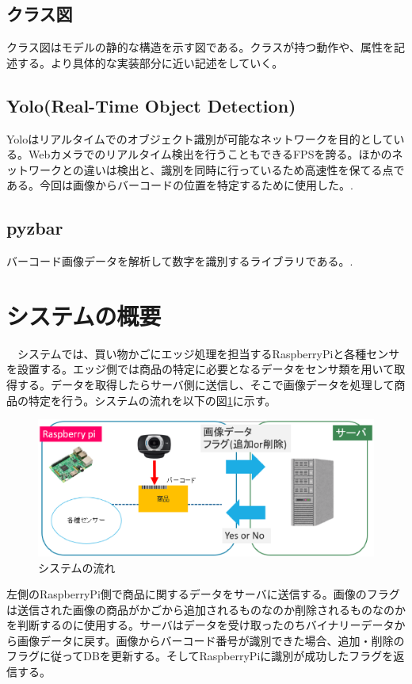 \subsection*{クラス図}
クラス図はモデルの静的な構造を示す図である。クラスが持つ動作や、属性を記述する。より具体的な実装部分に近い記述をしていく。

\subsection*{Yolo(Real-Time Object Detection)}
Yoloはリアルタイムでのオブジェクト識別が可能なネットワークを目的としている。Webカメラでのリアルタイム検出を行うこともできるFPSを誇る。ほかのネットワークとの違いは検出と、識別を同時に行っているため高速性を保てる点である。今回は画像からバーコードの位置を特定するために使用した。\cite{yolo}.


\subsection*{pyzbar}
バーコード画像データを解析して数字を識別するライブラリである。\cite{pyzbar}.

\section{システムの概要}
　システムでは、買い物かごにエッジ処理を担当するRaspberryPiと各種センサを設置する。エッジ側では商品の特定に必要となるデータをセンサ類を用いて取得する。データを取得したらサーバ側に送信し、そこで画像データを処理して商品の特定を行う。システムの流れを以下の図\ref{system_summary}に示す。


\begin{figure}[htbp]
\centering
\includegraphics[width=12cm]{./pic/summary.eps}
\caption{システムの流れ}
\label{system_summary}
\end{figure}

左側のRaspberryPi側で商品に関するデータをサーバに送信する。画像のフラグは送信された画像の商品がかごから追加されるものなのか削除されるものなのかを判断するのに使用する。サーバはデータを受け取ったのちバイナリーデータから画像データに戻す。画像からバーコード番号が識別できた場合、追加・削除のフラグに従ってDBを更新する。そしてRaspberryPiに識別が成功したフラグを返信する。

